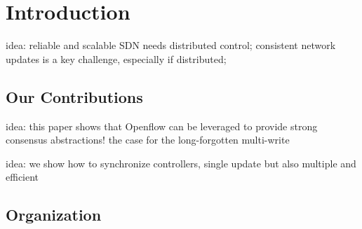 \documentclass[conference]{sigcomm-alternate}
\begin{document}








\section{Introduction}\label{sec:intro}

idea: reliable and scalable SDN needs distributed control; consistent network updates
is a key challenge, especially if distributed;


\subsection{Our Contributions}

idea: this paper shows that Openflow can be leveraged to provide strong consensus
abstractions! the case for the long-forgotten multi-write

idea: we show how to synchronize controllers, single update but also multiple and efficient

\subsection{Organization}
\end{document}
